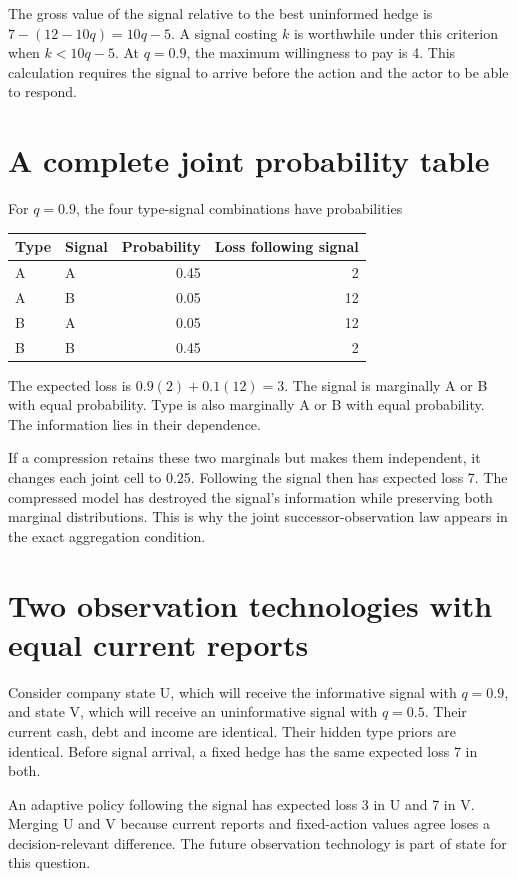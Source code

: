 The gross value of the signal relative to the best uninformed hedge is $7-(12-10q)=10q-5$. A signal costing $k$ is worthwhile under this criterion when $k<10q-5$. At $q=0.9$, the maximum willingness to pay is 4. This calculation requires the signal to arrive before the action and the actor to be able to respond.

\section{A complete joint probability table}
For $q=0.9$, the four type-signal combinations have probabilities
\begin{center}
\begin{tabular}{llrr}
\toprule Type&Signal&Probability&Loss following signal\\\midrule
A&A&0.45&2\\
A&B&0.05&12\\
B&A&0.05&12\\
B&B&0.45&2\\\bottomrule
\end{tabular}
\end{center}
The expected loss is $0.9(2)+0.1(12)=3$. The signal is marginally A or B with equal probability. Type is also marginally A or B with equal probability. The information lies in their dependence.

If a compression retains these two marginals but makes them independent, it changes each joint cell to 0.25. Following the signal then has expected loss 7. The compressed model has destroyed the signal's information while preserving both marginal distributions. This is why the joint successor-observation law appears in the exact aggregation condition.

\section{Two observation technologies with equal current reports}
Consider company state U, which will receive the informative signal with $q=0.9$, and state V, which will receive an uninformative signal with $q=0.5$. Their current cash, debt and income are identical. Their hidden type priors are identical. Before signal arrival, a fixed hedge has the same expected loss 7 in both.

An adaptive policy following the signal has expected loss 3 in U and 7 in V. Merging U and V because current reports and fixed-action values agree loses a decision-relevant difference. The future observation technology is part of state for this question.

